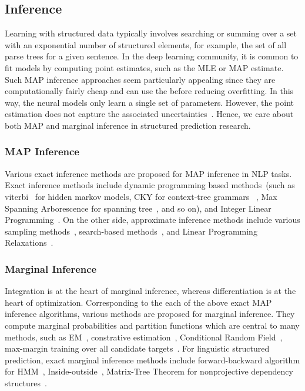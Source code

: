 \subsection{Inference}
\label{ssec:bg:inference}

Learning with structured data typically involves searching or summing
over a set with an exponential number of structured elements, for
example, the set of all parse trees for a given sentence. In the deep
learning community, it is common to fit models by computing point
estimates, such as the MLE or MAP estimate. Such MAP inference
approaches seem particularly appealing since they are computationally
fairly cheap and can use the before reducing overfitting. In this
way, the neural models only learn a single set of parameters. However,
the point estimation does not capture the associated
uncertainties~\citep{murphy2022probabilistic,wilson2020bayesian}.
Hence, we care about both MAP
and marginal inference in structured prediction research.

\subsubsection{MAP Inference}
\label{sssec:bg:map-inference}
Various exact inference methods are proposed
for MAP inference in NLP tasks. Exact inference methods include
dynamic programming based methods~(such as
viterbi~\citep{viterbi1967error} for hidden markov models, CKY for
context-tree
grammars~\citep{kasami1966efficient,younger1967recognition,cocke1969programming}
, Max Spanning Arborescence for spanning
tree~\citep{chu1965shortest,edmonds1967optimum}, and so on), and
Integer Linear
Programming~\citep{roth2005integer,roth2007global,berant2014modeling}. On the other side, approximate inference methods include various
sampling methods~\citep{finkel2005incorporating,singh2012monte},
search-based
methods~\citep{daume2009search,ross2011reduction,chang2015learning},
and Linear Programming
Relaxations~\citep{rush2012tutorial,werner2014power}.

\subsubsection{Marginal Inference}
\label{sssec:bg:marginal-inference}
Integration is at the heart of marginal inference, whereas
differentiation is at the heart of optimization. Corresponding to the
each of the above exact MAP inference algorithms, various methods are
proposed for marginal inference. They compute marginal probabilities
and partition functions which are central to many methods, such as
EM~\citep{baker1979trainable,weizenbaum1966eliza}, constrative
estimation~\citep{smith2005contrastive}, Conditional Random
Field~\citep[CRF,][]{lafferty01crf}, max-margin training over all
candidate targets~\citep{koller2004max}. For linguistic structured
prediction, exact marginal inference methods include forward-backward
algorithm for HMM~\citep{binder1997space},
Inside-outside~\citep{baker1979trainable}, Matrix-Tree Theorem for
nonprojective dependency
structures~\citep{koo-etal-2007-structured,liu2018learning}.

